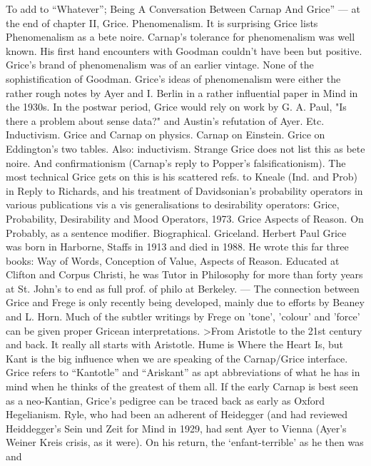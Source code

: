 \documentclass[10pt,titlepage]{book}
\begin{document}
To  add to 
“Whatever”;  Being  
A  Conversation Between Carnap And Grice” 
---  at the end of chapter II, Grice.  
Phenomenalism.  It is surprising Grice lists Phenomenalism as a bete 
noire. Carnap's tolerance  for phenomenalism was well known. His first hand 
encounters with Goodman  couldn't have been but positive. Grice's brand of 
phenomenalism was of an  earlier vintage. None of the sophistification of 
Goodman. Grice's ideas of  phenomenalism were either the rather rough notes by Ayer 
and I. Berlin in a  rather influential paper in Mind in the 1930s. In the 
postwar period, Grice  would rely on work by G. A. Paul, "Is there a problem 
about sense data?" and  Austin's refutation of Ayer. Etc. 
Inductivism.  Grice and Carnap on physics. Carnap on Einstein. Grice on 
Eddington's two  tables. Also: 
inductivism.  Strange Grice does not list this as bete noire. And 
confirmationism (Carnap's  reply to Popper's falsificationism). The most technical 
Grice gets on this is  his scattered refs. to Kneale (Ind. and Prob) in Reply 
to Richards, and his  treatment of Davidsonian's probability operators in 
various publications vis a  vis generalisations to desirability operators:  
Grice, Probability, Desirability and Mood  Operators, 1973. Grice Aspects of 
Reason. On Probably, as a sentence modifier.   
Biographical.  Griceland. Herbert Paul Grice was born in Harborne, Staffs 
in 1913 and died in  1988. He wrote this far three books: Way of Words, 
Conception of Value, Aspects  of Reason. Educated at Clifton and Corpus Christi, 
he was Tutor in Philosophy  for more than forty years at St. John's to end 
as full prof. of philo at  Berkeley. ---  The connection between Grice and 
Frege is only recently being developed, mainly  due to efforts by Beaney and 
L. Horn. Much of the subtler writings by Frege on  'tone', 'colour' and 
'force' can be given proper Gricean  interpretations. 
>From  Aristotle to the 21st century and back.  It really all starts with 
Aristotle. Hume  is Where the Heart Is, but Kant is the big influence when we 
are speaking of the  Carnap/Grice interface. Grice refers to “Kantotle” and 
“Ariskant” as apt  abbreviations of what he has in mind when he thinks of 
the greatest of them all.  If the early Carnap is best seen as a 
neo-Kantian, Grice’s pedigree can be  traced back as early as Oxford Hegelianism. Ryle, 
who had been an adherent of  Heidegger (and had reviewed Heiddegger’s Sein 
und Zeit for Mind in 1929, had  sent Ayer to Vienna (Ayer’s Weiner Kreis 
crisis, as it were). On his return, the  ‘enfant-terrible’ as he then was and 
\end{document}
